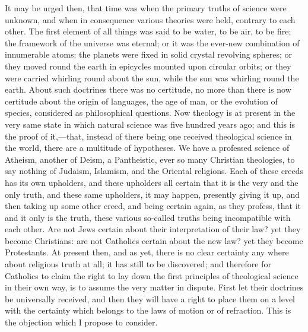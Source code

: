 It may be urged then, that time was when the primary truths of
science were unknown, and when in consequence various theories were
held, contrary to each other. The first element of all things was said
to be water, to be air, to be fire; the framework of the universe was
eternal; or it was the ever-new combination of innumerable atoms: the
planets were fixed in solid crystal revolving spheres; or they moved
round the earth in epicycles mounted upon circular orbits; or they
were carried whirling round about the sun, while the sun was whirling
round the earth. About such doctrines there was no certitude, no more
than there is now certitude about the origin of languages, the
age of man, or the evolution of species, considered as philosophical
questions. Now theology is at present in the very same state in which
natural science was five hundred years ago; and this is the proof of
it,—that, instead of there being one received theological science in
the world, there are a multitude of hypotheses. We have a professed
science of Atheism, another of Deism, a Pantheistic, ever so many
Christian theologies, to say nothing of Judaism, Islamism, and the
Oriental religions. Each of these creeds has its own upholders, and
these upholders all certain that it is the very and the only truth,
and these same upholders, it may happen, presently giving it up, and
then taking up some other creed, and being certain again, as they
profess, that it and it only is the truth, these various so-called
truths being incompatible with each other. Are not Jews certain about
their interpretation of their law? yet they become Christians: are not
Catholics certain about the new law? yet they become Protestants. At
present then, and as yet, there is no clear certainty any where about
religious truth at all; it has still to be discovered; and therefore
for Catholics to claim the right to lay down the first principles of
theological science in their own way, is to assume the very matter in
dispute. First let their doctrines be universally received, and then
they will have a right to place them on a level with the certainty
which belongs to the laws of motion or of refraction. This is the
objection which I propose to consider.

